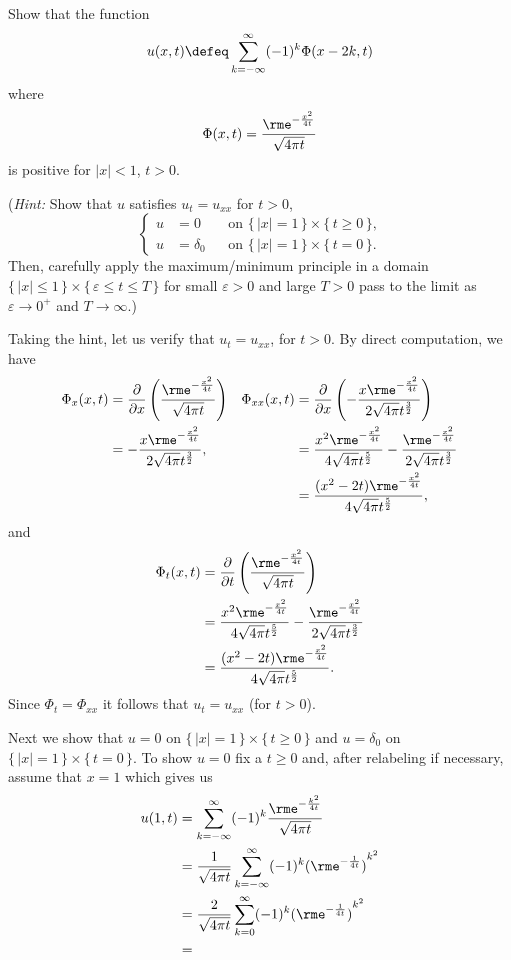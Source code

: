 \begin{problem}
  Show that the function
  \[
    u(x,t)\defeq\sum_{k=-\infty}^\infty (-1)^k\Phi(x-2k,t)
  \]
  where
  \[
    \Phi(x,t)=\frac{\rme^{-\frac{x^2}{4t}}}{\sqrt{4\pi t}}
  \]
  is positive for \(|x|<1\), \(t>0\).

  \noindent (\emph{Hint:} Show that \(u\) satisfies \(u_t=u_{xx}\) for
  \(t>0\),
  \[
    \left\{
      \begin{aligned}
        u&=0&&\text{on \(\{\,|x|=1\,\}\times\{\,t\geq 0\,\}\),}\\
        u&=\delta_0&&\text{on \(\{\,|x|=1\,\}\times\{\,t=0\,\}\).}
      \end{aligned}
    \right.
  \]
  Then, carefully apply the maximum/minimum principle in a domain
  \(\{\,|x|\leq 1\,\}\times\{\,\varepsilon\leq t\leq T\,\}\) for small
  \(\varepsilon>0\) and large \(T>0\) pass to the limit as \(\varepsilon\to
  0^+\) and \(T\to\infty\).)
\end{problem}
\begin{solution}
  Taking the hint, let us verify that \(u_t=u_{xx}\), for \(t>0\). By
  direct computation, we have
  \begin{align*}
    \Phi_x(x,t)
    &=\frac{\partial}{\partial x}
      \left(\frac{\rme^{-\frac{x^2}{4t}}}{\sqrt{4\pi t}}\right)
    &\Phi_{xx}(x,t)
    &=\frac{\partial}{\partial x}
      \left(-\frac{x\rme^{-\frac{x^2}{4t}}}{2\sqrt{4\pi}t^{\frac{3}{2}}}\right)\\
    &=-\frac{x\rme^{-\frac{x^2}{4t}}}{2\sqrt{4\pi}t^{\frac{3}{2}}},
    &&=\frac{x^2\rme^{-\frac{x^2}{4t}}}{4\sqrt{4\pi}t^{\frac{5}{2}}}
      -\frac{\rme^{-\frac{x^2}{4t}}}{2\sqrt{4\pi}t^{\frac{3}{2}}}
    \\
    &&&=\frac{(x^2-2t)\rme^{-\frac{x^2}{4t}}}{4\sqrt{4\pi}t^{\frac{5}{2}}},
  \end{align*}
  and
  \begin{align*}
    \Phi_t(x,t)
    &=\frac{\partial}{\partial t}
      \left(\frac{\rme^{-\frac{x^2}{4t}}}{\sqrt{4\pi t}}\right)\\
    &=\frac{x^2\rme^{-\frac{x^2}{4t}}}{4\sqrt{4\pi}t^{\frac{5}{2}}}
      -\frac{\rme^{-\frac{x^2}{4t}}}{2\sqrt{4\pi}t^{\frac{3}{2}}}\\
    &=\frac{(x^2-2t)\rme^{-\frac{x^2}{4t}}}{4\sqrt{4\pi}t^{\frac{5}{2}}}.
  \end{align*}
  Since \(\Phi_t=\Phi_{xx}\) it follows that \(u_t=u_{xx}\) (for \(t>0\)).

  Next we show that \(u=0\) on \(\{\,|x|=1\,\}\times\{\,t\geq 0\,\}\) and
  \(u=\delta_0\) on \(\{\,|x|=1\,\}\times\{\,t=0\,\}\). To show \(u=0\) fix
  a \(t\geq 0\) and, after relabeling if necessary, assume that \(x=1\)
  which gives us
  \begin{align*}
    u(1,t)
    &=\sum_{k=-\infty}^\infty(-1)^k\frac{\rme^{-\frac{k^2}{4t}}}{\sqrt{4\pi
      t}}\\
    &=\frac{1}{\sqrt{4\pi t}}\sum_{k=-\infty}^\infty
      (-1)^k{(\rme^{-\frac{1}{4t}})}^{k^2}\\
    &=\frac{2}{\sqrt{4\pi t}}\sum_{k=0}^\infty
      (-1)^k{(\rme^{-\frac{1}{4t}})}^{k^2}\\
    &=
  \end{align*}
\end{solution}
